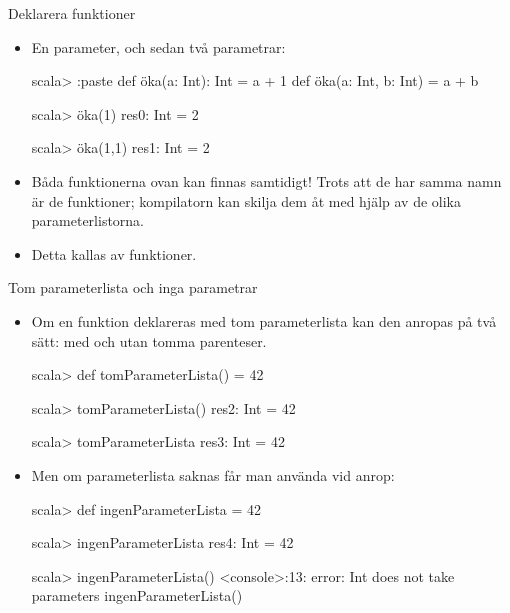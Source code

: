 




\begin{Slide}{Deklarera funktioner}
\begin{itemize}
\item En parameter, och sedan två parametrar:
\begin{REPL}
scala> :paste
  def öka(a: Int): Int = a + 1
  def öka(a: Int, b: Int) = a + b
  
scala> öka(1)
res0: Int = 2

scala> öka(1,1)
res1: Int = 2

\end{REPL}
\item Båda funktionerna ovan kan finnas samtidigt! Trots att de har samma namn är de  funktioner; kompilatorn kan skilja dem åt med hjälp av de olika parameterlistorna.

\item Detta kallas   av funktioner.

\end{itemize}
\end{Slide} 


\begin{Slide}{Tom parameterlista och inga parametrar}\SlideFontSmall
\begin{itemize}
\item Om en funktion deklareras med tom parameterlista \code{()} kan den anropas på två sätt: med och utan tomma parenteser.
\begin{REPL}
scala> def tomParameterLista() = 42

scala> tomParameterLista()
res2: Int = 42

scala> tomParameterLista
res3: Int = 42
\end{REPL}

\item Men om parameterlista saknas får man  använda \code{()} vid anrop:

\begin{REPL}

scala> def ingenParameterLista = 42

scala> ingenParameterLista
res4: Int = 42

scala> ingenParameterLista()
<console>:13: error: Int does not take parameters
       ingenParameterLista()
\end{REPL}

\end{itemize}
\end{Slide} 



